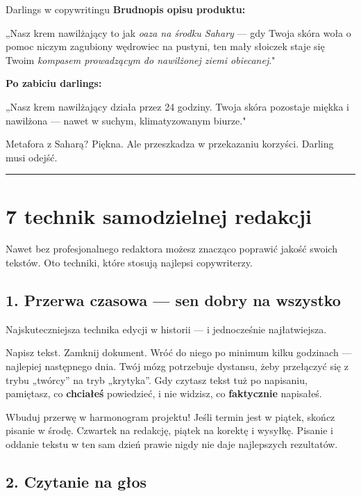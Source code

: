 \documentclass[
  12pt,
  a4paper,
  twoside,
  openright,
  12pt,
  DIV=12,
  BCOR=12mm]{scrbook}
\newcommand{\decoline}{%
  \begin{center}
    \textcolor{bordergray}{\rule{0.3\textwidth}{0.5pt}}
  \end{center}
}
\begin{document}
\begin{przyklad}{Darlings w copywritingu}
\textbf{Brudnopis opisu produktu:}

„Nasz krem nawilżający to jak \textit{oaza na środku Sahary} --- gdy Twoja skóra woła o pomoc niczym zagubiony wędrowiec na pustyni, ten mały słoiczek staje się Twoim \textit{kompasem prowadzącym do nawilżonej ziemi obiecanej}."

\textbf{Po zabiciu darlings:}

„Nasz krem nawilżający działa przez 24 godziny. Twoja skóra pozostaje miękka i nawilżona --- nawet w suchym, klimatyzowanym biurze."

Metafora z Saharą? Piękna. Ale przeszkadza w przekazaniu korzyści. Darling musi odejść.
\end{przyklad}

\decoline

\section{7 technik samodzielnej
redakcji}\label{technik-samodzielnej-redakcji}

Nawet bez profesjonalnego redaktora możesz znacząco poprawić jakość
swoich tekstów. Oto techniki, które stosują najlepsi copywriterzy.

\subsection{1. Przerwa czasowa --- sen dobry na
wszystko}\label{przerwa-czasowa-sen-dobry-na-wszystko}

Najskuteczniejsza technika edycji w historii --- i jednocześnie
najłatwiejsza.

Napisz tekst. Zamknij dokument. Wróć do niego po minimum kilku godzinach
--- najlepiej następnego dnia. Twój mózg potrzebuje dystansu, żeby
przełączyć się z trybu „twórcy'' na tryb „krytyka''. Gdy czytasz tekst
tuż po napisaniu, pamiętasz, co \textbf{chciałeś} powiedzieć, i nie
widzisz, co \textbf{faktycznie} napisałeś.

\begin{wazne}
Wbuduj przerwę w harmonogram projektu! Jeśli termin jest w piątek, skończ pisanie w środę. Czwartek na redakcję, piątek na korektę i wysyłkę. Pisanie i oddanie tekstu w ten sam dzień prawie nigdy nie daje najlepszych rezultatów.
\end{wazne}

\subsection{2. Czytanie na głos}\label{czytanie-na-gux142os}
\end{document}
